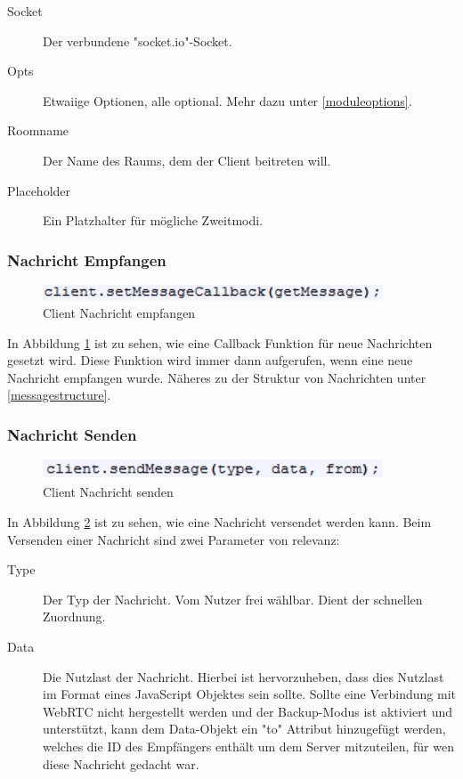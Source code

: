 \begin{description}
\item[Socket]
Der verbundene "socket.io"-Socket.

\item[Opts]
Etwaiige Optionen, alle optional. Mehr dazu unter \ref{moduleoptions}.

\item[Roomname]
Der Name des Raums, dem der Client beitreten will.

\item[Placeholder]
Ein Platzhalter für mögliche Zweitmodi.
\end{description}



\subsubsection{Nachricht Empfangen}
\begin{figure}[htH]
\centering
\includegraphics[width=0.9\textwidth]{backend/Modul_UserClientHowToMessageCallback.PNG}
\caption{Client Nachricht empfangen}
\label{backfig12}
\end{figure}
In Abbildung \ref{backfig12} ist zu sehen, wie eine Callback Funktion für neue Nachrichten gesetzt wird. 
Diese Funktion wird immer dann aufgerufen, wenn eine neue Nachricht empfangen wurde. Näheres zu der Struktur von Nachrichten unter \ref{messagestructure}.



\subsubsection{Nachricht Senden}
\begin{figure}[htH]
\centering
\includegraphics[width=0.9\textwidth]{backend/Modul_UserClientHowToSendMessage.PNG}
\caption{Client Nachricht senden}
\label{backfig13}
\end{figure}
In Abbildung \ref{backfig13} ist zu sehen, wie eine Nachricht versendet werden kann.
Beim Versenden einer Nachricht sind zwei Parameter von relevanz:

\begin{description}
\item[Type]
Der Typ der Nachricht. Vom Nutzer frei wählbar. Dient der schnellen Zuordnung.

\item[Data]
Die Nutzlast der Nachricht. Hierbei ist hervorzuheben, dass dies Nutzlast im Format eines JavaScript Objektes sein sollte. Sollte eine Verbindung mit WebRTC nicht hergestellt werden und der Backup-Modus ist aktiviert und unterstützt, kann dem Data-Objekt ein "to" Attribut hinzugefügt werden, welches die ID des Empfängers enthält um dem Server mitzuteilen, für wen diese Nachricht gedacht war.
\end{description}



